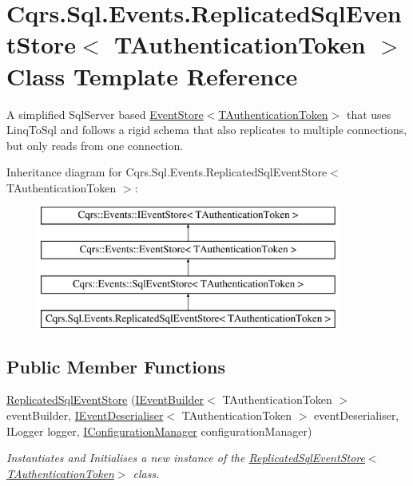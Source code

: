 \hypertarget{classCqrs_1_1Sql_1_1Events_1_1ReplicatedSqlEventStore}{}\section{Cqrs.\+Sql.\+Events.\+Replicated\+Sql\+Event\+Store$<$ T\+Authentication\+Token $>$ Class Template Reference}
\label{classCqrs_1_1Sql_1_1Events_1_1ReplicatedSqlEventStore}


A simplified Sql\+Server based \hyperlink{classCqrs_1_1Events_1_1EventStore_a6346cb2aea4c5b4e740dc6cfb15abab8_a6346cb2aea4c5b4e740dc6cfb15abab8}{Event\+Store$<$\+T\+Authentication\+Token$>$} that uses Linq\+To\+Sql and follows a rigid schema that also replicates to multiple connections, but only reads from one connection.  


Inheritance diagram for Cqrs.\+Sql.\+Events.\+Replicated\+Sql\+Event\+Store$<$ T\+Authentication\+Token $>$\+:\begin{figure}[H]
\begin{center}
\leavevmode
\includegraphics[height=4.000000cm]{classCqrs_1_1Sql_1_1Events_1_1ReplicatedSqlEventStore}
\end{center}
\end{figure}
\subsection*{Public Member Functions}
\begin{DoxyCompactItemize}
\item 
\hyperlink{classCqrs_1_1Sql_1_1Events_1_1ReplicatedSqlEventStore_aa00d17e2b147ebf7d2aff5ef1a543c07_aa00d17e2b147ebf7d2aff5ef1a543c07}{Replicated\+Sql\+Event\+Store} (\hyperlink{interfaceCqrs_1_1Events_1_1IEventBuilder}{I\+Event\+Builder}$<$ T\+Authentication\+Token $>$ event\+Builder, \hyperlink{interfaceCqrs_1_1Events_1_1IEventDeserialiser}{I\+Event\+Deserialiser}$<$ T\+Authentication\+Token $>$ event\+Deserialiser, I\+Logger logger, \hyperlink{interfaceCqrs_1_1Configuration_1_1IConfigurationManager}{I\+Configuration\+Manager} configuration\+Manager)
\begin{DoxyCompactList}\small\item\em Instantiates and Initialises a new instance of the \hyperlink{classCqrs_1_1Sql_1_1Events_1_1ReplicatedSqlEventStore_aa00d17e2b147ebf7d2aff5ef1a543c07_aa00d17e2b147ebf7d2aff5ef1a543c07}{Replicated\+Sql\+Event\+Store$<$\+T\+Authentication\+Token$>$} class. \end{DoxyCompactList}\end{DoxyCompactItemize}
